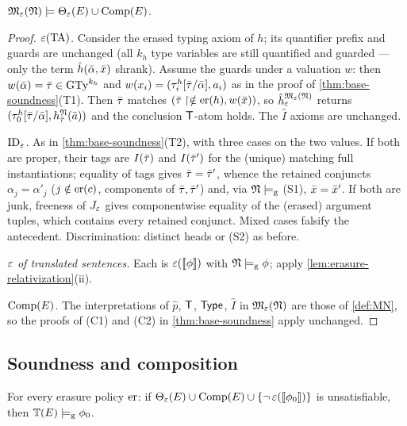 \begin{theorem}
  \label{thm:erased-correct}
  $\mathfrak{M}_{\varepsilon}(\mathfrak{N}) \models \Theta_{\varepsilon}(E) \cup \mathrm{Comp}(E)$.
\end{theorem}

\begin{proof}
  \emph{$\varepsilon(\mathrm{TA})$.}  Consider the erased typing axiom of $h$;
  its quantifier prefix and guards are unchanged (all $k_h$ type
  variables are still quantified and guarded --- only the term
  $\hat h(\bar{\alpha}, \bar{x})$ shrank).  Assume the guards under a
  valuation $w$: then $w(\bar{\alpha}) = \bar{\tau} \in \mathrm{GTy}^{k_h}$ and
  $w(x_i) = (\tau^h_i[\bar{\tau}/\bar{\alpha}], a_i)$ as in the proof of
  \cref{thm:base-soundness}(T1).  Then $\bar{\tau}$ matches
  $(\bar{\tau}\upharpoonright\notin\mathrm{er}(h), w(\bar{x}))$, so
  $\hat h_{\varepsilon}^{\mathfrak{M}_{\varepsilon}(\mathfrak{N})}$ returns
  $(\tau^h_0[\bar{\tau}/\bar{\alpha}], h^{\mathfrak{N}}_{\bar{\tau}}(\bar{a}))$ and the
  conclusion $\mathsf{T}$-atom holds.  The $\hat I$ axioms are unchanged.

  \emph{$\mathrm{ID}_{\varepsilon}$.}  As in \cref{thm:base-soundness}(T2), with
  three cases on the two values.  If both are proper, their tags are
  $I(\bar{\tau})$ and $I(\bar{\tau}')$ for the (unique) matching full
  instantiations; equality of tags gives $\bar{\tau} = \bar{\tau}'$, whence
  the retained conjuncts $\alpha_j = \alpha'_j$ ($j \notin \mathrm{er}(c)$,
  components of $\bar{\tau}, \bar{\tau}'$) and, via $\mathfrak{N} \models_{\mathrm{g}}$ (S1),
  $\bar{x} = \bar{x}'$.  If both are junk, freeness of $J_{\varepsilon}$ gives
  componentwise equality of the (erased) argument tuples, which contains
  every retained conjunct.  Mixed cases falsify the antecedent.
  Discrimination: distinct heads or (S2) as before.

  \emph{$\varepsilon$ of translated sentences.}  Each is
  $\varepsilon([\![ \phi ]\!])$ with $\mathfrak{N} \models_{\mathrm{g}} \phi$; apply
  \cref{lem:erasure-relativization}(ii).

  \emph{$\mathrm{Comp}(E)$.}  The interpretations of $\hat p$, $\mathsf{T}$, $\mathsf{Type}$,
  $\hat I$ in $\mathfrak{M}_{\varepsilon}(\mathfrak{N})$ are those of \cref{def:MN}, so the proofs of (C1)
  and (C2) in \cref{thm:base-soundness} apply unchanged.
\end{proof}

\subsection{Soundness and composition}

\begin{theorem}
  \label{thm:erasure-soundness}
  For every erasure policy $\mathrm{er}$: if
  $\Theta_{\varepsilon}(E) \cup \mathrm{Comp}(E) \cup \{\neg\,\varepsilon([\![ \phi_0 ]\!])\}$ is unsatisfiable,
  then $\mathbb{T}(E) \models_{\mathrm{g}} \phi_0$.
\end{theorem}

